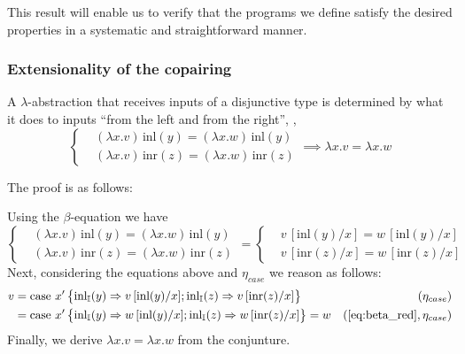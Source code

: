  This result will enable us to verify that the programs we define satisfy the desired properties in a systematic and straightforward manner.



\subsubsection{Extensionality of the copairing}

A $\lambda$-abstraction that receives inputs of a disjunctive type is determined by what it does to inputs ``from the left and from the right'', \ie,
\[
\left\{
\begin{aligned}
&(\lambda x.v)\, \text{inl}(y) = (\lambda x.w)\, \text{inl}(y) \\
&(\lambda x.v)\, \text{inr}(z) =(\lambda x.w)\, \text{inr}(z)
\end{aligned}
\right.
\implies \lambda x.v = \lambda x.w
\]

The proof is as follows:

Using the $\beta$-equation we have
\begin{equation} \label{eq:beta_red}
  \left\{
\begin{aligned}
&(\lambda x.v)\, \text{inl}(y) = (\lambda x.w)\, \text{inl}(y) \\
&(\lambda x.v)\, \text{inr}(z) =(\lambda x.w)\, \text{inr}(z)
\end{aligned}
\right.
= \left\{
\begin{aligned}
&v\,[\text{inl}(y)/x]  = w\, [\text{inl}(y)/x] \\
&v\,[\text{inr}(z)/x]  = w\, [\text{inr}(z)/x] 
\end{aligned}
\right.
\end{equation}
Next, considering the equations above and  $\eta_{case}$ we reason as follows:
\begin{equation*}
\begin{split}
 v &= \text{case } x'  
    \left\{ \begin{aligned}
    \inl_{\typeI}(y) \Rightarrow v\,[\text{inl}(y)/x] ;  
    \inl_{\typeI}(z) \Rightarrow v\,[\text{inr}(z)/x]
  \end{aligned}  \right\} & (\eta_{case})\\
  & = \text{case } x'  
    \left\{ \begin{aligned}
    \inl_{\typeI}(y) \Rightarrow w\,[\text{inl}(y)/x] ;  
    \inl_{\typeI}(z) \Rightarrow w\,[\text{inr}(z)/x]
  \end{aligned}  \right\} = w & (\text{\autoref{eq:beta_red}},\eta_{case})
\end{split}
\end{equation*}
Finally, we derive $ \lambda x.v = \lambda x.w$ from the conjunture.



